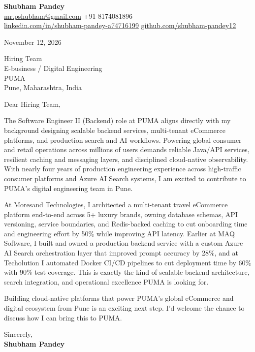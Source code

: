 \documentclass[a4paper,11pt]{article}
\begin{document}
\textbf{\Large Shubham Pandey}\\
\href{mailto:mr.pshubham@gmail.com}{mr.pshubham@gmail.com} \quad +91-8174081896\\
\href{https://www.linkedin.com/in/shubham-pandey-a74716199/}{linkedin.com/in/shubham-pandey-a74716199} \quad
\href{https://github.com/shubham-pandey12}{github.com/shubham-pandey12}

\vspace{1em}
November 12, 2026

\vspace{1em}
Hiring Team\\
E-business / Digital Engineering\\
PUMA\\
Pune, Maharashtra, India

\vspace{1em}
Dear Hiring Team,

The Software Engineer II (Backend) role at PUMA aligns directly with my background designing scalable backend services, multi-tenant eCommerce platforms, and production search and AI workflows. Powering global consumer and retail operations across millions of users demands reliable Java/API services, resilient caching and messaging layers, and disciplined cloud-native observability. With nearly four years of production engineering experience across high-traffic consumer platforms and Azure AI Search systems, I am excited to contribute to PUMA's digital engineering team in Pune.

At Moresand Technologies, I architected a multi-tenant travel eCommerce platform end-to-end across 5+ luxury brands, owning database schemas, API versioning, service boundaries, and Redis-backed caching to cut onboarding time and engineering effort by 50\% while improving API latency. Earlier at MAQ Software, I built and owned a production backend service with a custom Azure AI Search orchestration layer that improved prompt accuracy by 28\%, and at Techolution I automated Docker CI/CD pipelines to cut deployment time by 60\% with 90\% test coverage. This is exactly the kind of scalable backend architecture, search integration, and operational excellence PUMA is looking for.

Building cloud-native platforms that power PUMA's global eCommerce and digital ecosystem from Pune is an exciting next step. I'd welcome the chance to discuss how I can bring this to PUMA.

\vspace{1em}
Sincerely,\\[0.5em]
\textbf{Shubham Pandey}
\end{document}
